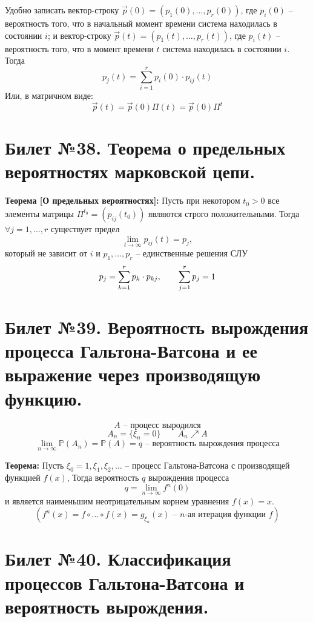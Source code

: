 Удобно записать вектор-строку $\vec{p}(0) = \left( p_1(0), \ldots, p_r(0) \right)$, где $p_i(0)$ -- вероятность того, что в начальный момент времени система находилась в состоянии $i$; и вектор-строку $\vec{p}(t) = \left( p_1(t), \ldots, p_r(t) \right)$, где $p_i(t)$ -- вероятность того, что в момент времени $t$ система находилась в состоянии $i$. Тогда
\[p_j(t) = \sum_{i=1}^{r} p_i(0) \cdot p_{ij}(t) \]
Или, в матричном виде:
\[\vec{p}(t) = \vec{p}(0) \Pi(t) = \vec{p}(0) \Pi^t \]

\section{Билет №38. Теорема о предельных вероятностях марковской цепи.}

\hspace{\parindent}\textbf{Теорема [О предельных вероятностях]:} Пусть при некотором $t_0 > 0$ все элементы матрицы $\Pi^{t_0} = (p_{ij}(t_0))$ являются строго положительными. Тогда $\forall j = 1, \ldots, r$ существует предел
\[\lim_{t \to \infty} p_{ij}(t) = p_j, \] 
который не зависит от $i$ и $p_1, \ldots, p_r$ -- единственные решения СЛУ
\[p_j = \sum_{k=1}^{r} p_k \cdot p_{kj}, \hspace*{2em} \sum_{j=1}^{r} p_j = 1 \]

\section{Билет №39. Вероятность вырождения процесса Гальтона-Ватсона и ее выражение через производящую функцию.}

\[A \text{ -- процесс выродился} \]
\[A_n = \{\xi_n = 0\} \hspace{2em} A_n \nearrow A \]
\[\lim_{n \to \infty} \mathbb{P}(A_n) = \mathbb{P}(A) = q \text{ -- вероятность вырождения процесса}\]

\textbf{Теорема:} Пусть $\xi_0 = 1, \xi_1, \xi_2, \ldots$ -- процесс Гальтона-Ватсона с производящей функцией $f(x)$, Тогда вероятность $q$ вырождения процесса
\[q = \lim_{n \to \infty}f^n(0) \]
и является наименьшим неотрицательным корнем уравнения $f(x) = x$. 
\[(f^n(x) = f \circ \ldots \circ f(x) = g_{\xi_n}(x) \text{ -- } n\text{-ая итерация функции } f)\]

\section{Билет №40. Классификация процессов Гальтона-Ватсона и вероятность вырождения.}

